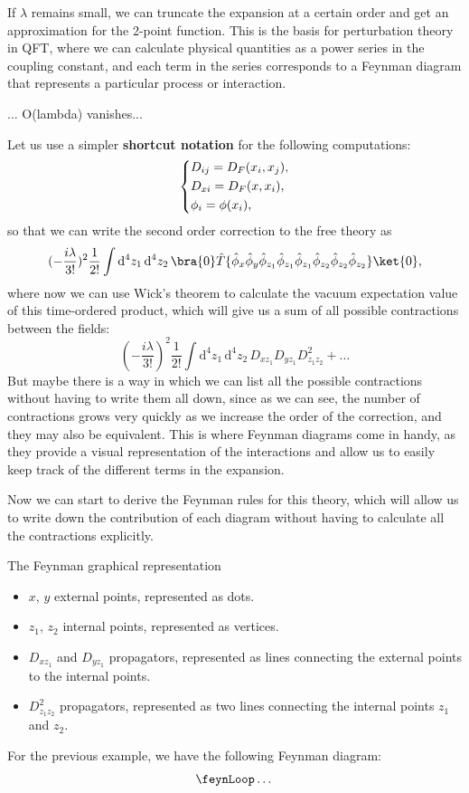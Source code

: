 \begin{example}
    If \(\lambda\) remains small, we can truncate the expansion at a certain order and get an approximation for the 2-point function. This is the basis for perturbation theory in QFT, where we can calculate physical quantities as a power series in the coupling constant, and each term in the series corresponds to a Feynman diagram that represents a particular process or interaction.

    ... O(lambda) vanishes...

    Let us use a simpler \textbf{shortcut notation} for the following computations:
    \[
        \begin{dcases}
            D_{ij} = D_F (x_i, x_j), \\
            D_{xi} = D_F (x, x_i),   \\
            \phi_i = \phi (x_i),
        \end{dcases}
    \]
    so that we can write the second order correction to the free theory as
    \[
        (-\frac{i \lambda}{3!})^2 \frac{1}{2!} \int \mathrm{d}^4 z_1 \, \mathrm{d}^4 z_2 \, \bra{0} \hat{T} \{ \hat{\phi}_x \hat{\phi}_y \hat{\phi}_{z_1} \hat{\phi}_{z_1} \hat{\phi}_{z_1} \hat{\phi}_{z_2} \hat{\phi}_{z_2} \hat{\phi}_{z_2}\} \ket{0},
    \]
    where now we can use Wick's theorem to calculate the vacuum expectation value of this time-ordered product, which will give us a sum of all possible contractions between the fields:
    \[
        (-\frac{i \lambda}{3!})^2 \frac{1}{2!} \int \mathrm{d}^4 z_1 \, \mathrm{d}^4 z_2 \, D_{x z_1} D_{y z_1} D_{z_1 z_2}^2 + \dots
    \]
    But maybe there is a way in which we can list all the possible contractions without having to write them all down, since as we can see, the number of contractions grows very quickly as we increase the order of the correction, and they may also be equivalent. This is where Feynman diagrams come in handy, as they provide a visual representation of the interactions and allow us to easily keep track of the different terms in the expansion.
\end{example}

Now we can start to derive the Feynman rules for this theory, which will allow us to write down the contribution of each diagram without having to calculate all the contractions explicitly.

The Feynman graphical representation
\begin{itemize}
    \item \(x, \, y\) external points, represented as dots.
    \item \(z_1, \, z_2\) internal points, represented as vertices.
    \item \(D_{x z_1}\) and \(D_{y z_1}\) propagators, represented as lines connecting the external points to the internal points.
    \item \(D_{z_1 z_2}^2\) propagators, represented as two lines connecting the internal points \(z_1\) and \(z_2\).
\end{itemize}
For the previous example, we have the following Feynman diagram:
\[
    \feynLoop \dots
\]

